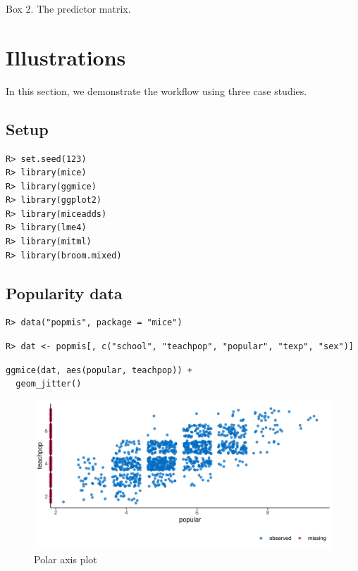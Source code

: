 \documentclass[
  article]{jss}
\begin{document}
\begin{tcolorbox}[enhanced jigsaw, left=2mm, leftrule=.75mm, bottomrule=.15mm, toprule=.15mm, breakable, colback=white, opacityback=0, arc=.35mm, rightrule=.15mm]

Box 2. The predictor matrix.

\end{tcolorbox}

\hypertarget{sec-illustrations}{%
\section{Illustrations}\label{sec-illustrations}}

In this section, we demonstrate the workflow using three case studies.

\hypertarget{setup}{%
\subsection{Setup}\label{setup}}

\begin{verbatim}
R> set.seed(123)
R> library(mice)
R> library(ggmice)
R> library(ggplot2)
R> library(miceadds)
R> library(lme4)
R> library(mitml)
R> library(broom.mixed)
\end{verbatim}

\hypertarget{popularity-data}{%
\subsection{Popularity data}\label{popularity-data}}

\begin{verbatim}
R> data("popmis", package = "mice")
\end{verbatim}

\begin{verbatim}
R> dat <- popmis[, c("school", "teachpop", "popular", "texp", "sex")] 
\end{verbatim}

\begin{verbatim}
ggmice(dat, aes(popular, teachpop)) + 
  geom_jitter()
\end{verbatim}

\begin{figure}[t]

{\centering \includegraphics{manuscript_files/figure-pdf/unnamed-chunk-4-1.pdf}

}

\caption{Polar axis plot}

\end{figure}
\end{document}
